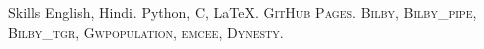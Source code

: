 
\begin{rubric}{Skills}
\entry*[Languages]
	English, Hindi.
	Python, C, \LaTeX.
	\textsc{GitHub Pages}.
\entry*[Packages]
	\textsc{Bilby, Bilby\_pipe, Bilby\_tgr, Gwpopulation, emcee, Dynesty}.
    
\end{rubric}
